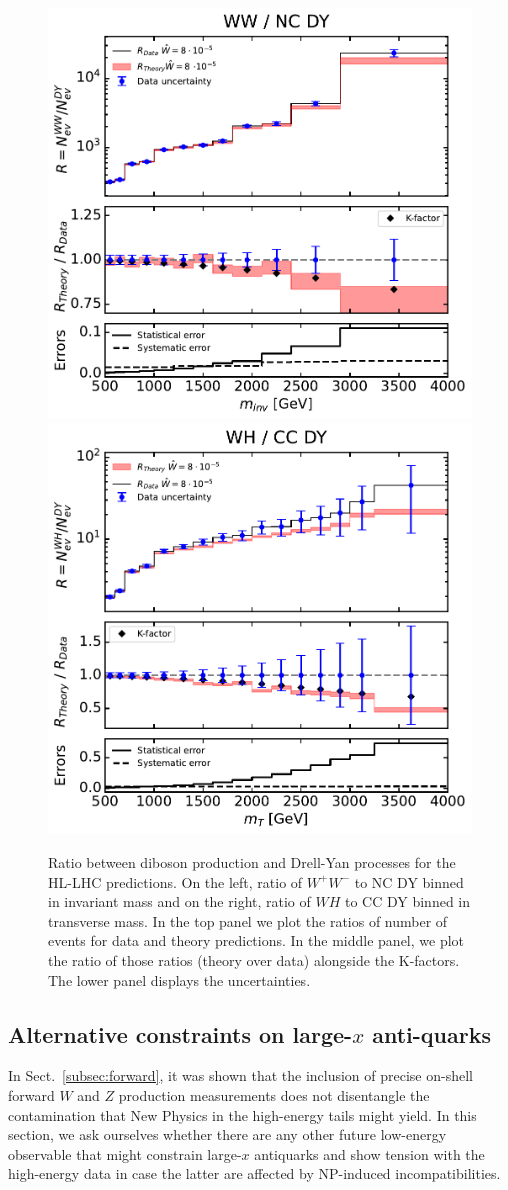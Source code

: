 \documentclass[withindex,glossary]{cam-thesis}
\begin{document}
%
\begin{figure}[H]
  \begin{center}
    \includegraphics[width=0.49\linewidth]{Figures/plot_wwdy_ratio_hllhc.pdf}
    \includegraphics[width=0.49\linewidth]{Figures/plot_WHDY_ratio_hllhc.pdf}
  \end{center}
	\caption{
    Ratio between diboson production and Drell-Yan processes for the HL-LHC predictions. On the left, ratio of $W^+ W^-$ to NC DY binned in invariant mass and on the right, ratio of $WH$ to CC DY binned in transverse mass.
    In the top panel we plot the ratios of number of events for data and theory predictions.
    In the middle panel, we plot the ratio of those ratios (theory over data) alongside the K-factors. The lower panel displays the uncertainties.
  }
  \label{fig:diboson_dy_ratio}
\end{figure}
%



\subsection{Alternative constraints on large-$x$ anti-quarks}
\label{subsec:lowE}

In Sect.~\ref{subsec:forward}, it was shown that the inclusion of precise on-shell forward $W$ and $Z$ 
production measurements does not disentangle the contamination that New Physics in the high-energy tails 
might yield. In this section, we ask ourselves whether there are any other future low-energy observable that 
might constrain large-$x$ antiquarks and show tension with the high-energy data in case the latter are 
affected by NP-induced incompatibilities.
\end{document}
